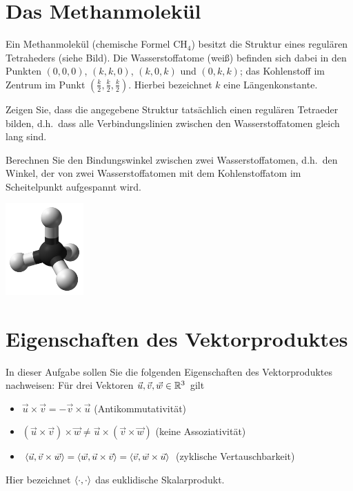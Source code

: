 \documentclass{scrartcl}
\begin{document}
\maketitle


\section{Das Methanmolekül}
Ein Methanmolekül (chemische Formel $\mathrm{CH}_4$) besitzt die Struktur eines regulären Tetraheders (siehe Bild).
Die Wasserstoffatome (weiß) befinden sich dabei in den Punkten $(0,0,0)$, $(k,k,0)$, $(k,0,k)$ und $(0,k,k)$; das Kohlenstoff im Zentrum im Punkt $(\frac{k}{2},\frac{k}{2},\frac{k}{2})$.
Hierbei bezeichnet $k$ eine Längenkonstante.
\begin{subex}
  \item Zeigen Sie, dass die angegebene Struktur tatsächlich einen regulären Tetraeder bilden, d.h.\ dass alle Verbindungslinien zwischen den Wasserstoffatomen gleich lang sind.
  \item Berechnen Sie den Bindungswinkel zwischen zwei Wasserstoffatomen, d.h.\ den Winkel, der von zwei Wasserstoffatomen mit dem Kohlenstoffatom im Scheitelpunkt aufgespannt wird.
\end{subex}

\begin{center}
  \includegraphics[width=3cm]{img/methan.png}
\end{center}


\section{Eigenschaften des Vektorproduktes}
In dieser Aufgabe sollen Sie die folgenden Eigenschaften des Vektorproduktes nachweisen:
Für drei Vektoren $\vec{u},\vec{v},\vec{w} \in \RR^3$ gilt
\begin{itemize}
  \item $\vec{u} \times \vec{v} = - \vec{v} \times \vec{u}$ (Antikommutativität)
  \item $(\vec{u} \times \vec{v}) \times \vec{w} \neq \vec{u} \times (\vec{v} \times \vec{w})$ (keine Assoziativität)
  \item $\sp{\vec{u}}{\vec{v} \times \vec{w}} = \sp{\vec{w}}{ \vec{u} \times \vec{v}} = \sp{\vec{v}}{ \vec{w} \times \vec{u}}$ (zyklische Vertauschbarkeit)
\end{itemize}
Hier bezeichnet $\sp{\cdot}{\cdot}$ das euklidische Skalarprodukt.
\end{document}
